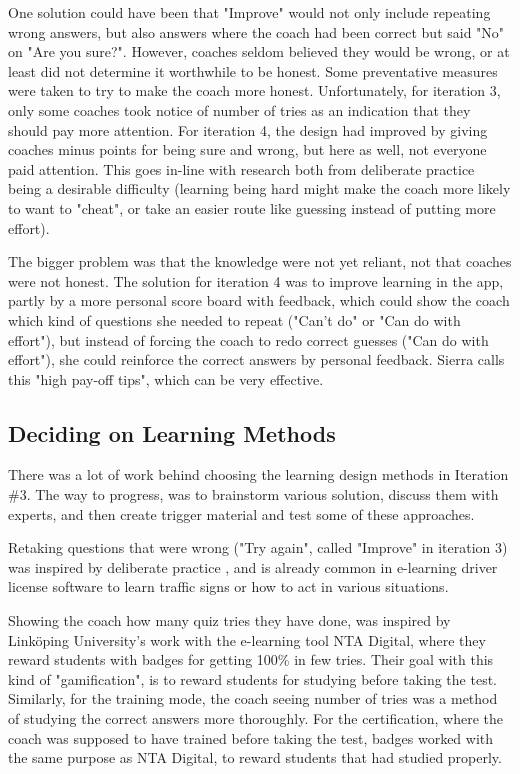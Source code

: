   One solution could have been that "Improve" would not only include repeating wrong answers, but also answers where the coach had been correct but said "No" on "Are you sure?". However, coaches seldom believed they would be wrong, or at least did not determine it worthwhile to be honest. Some preventative measures were taken to try to make the coach more honest. Unfortunately, for iteration 3, only some coaches took notice of number of tries as an indication that they should pay more attention. For iteration 4, the design had improved by giving coaches minus points for being sure and wrong, but here as well, not everyone paid attention. This goes in-line with research both from deliberate practice being a desirable difficulty (learning being hard might make the coach more likely to want to "cheat", or take an easier route like guessing instead of putting more effort).

  The bigger problem was that the knowledge were not yet reliant, not that coaches were not honest. The solution for iteration 4 was to improve learning in the app, partly by a more personal score board with feedback, which could show the coach which kind of questions she needed to repeat ("Can't do" or "Can do with effort"), but instead of forcing the coach to redo correct guesses ("Can do with effort"), she could reinforce the correct answers by personal feedback. Sierra \cite{sierra} calls this "high pay-off tips", which can be very effective.

  \subsection{Deciding on Learning Methods}
  There was a lot of work behind choosing the learning design methods in Iteration \#3. The way to progress, was to brainstorm various solution, discuss them with experts, and then create trigger material and test some of these approaches.

  Retaking questions that were wrong ("Try again", called "Improve" in iteration 3) was inspired by deliberate practice \cite{sierra}, and is already common in e-learning driver license software to learn traffic signs or how to act in various situations.

  Showing the coach how many quiz tries they have done, was inspired by Linköping University's work with the e-learning tool NTA Digital, where they reward students with badges for getting 100\% in few tries. Their goal with this kind of "gamification", is to reward students for studying before taking the test. Similarly, for the training mode, the coach seeing number of tries was a method of studying the correct answers more thoroughly. For the certification, where the coach was supposed to have trained before taking the test, badges worked with the same purpose as NTA Digital, to reward students that had studied properly.

